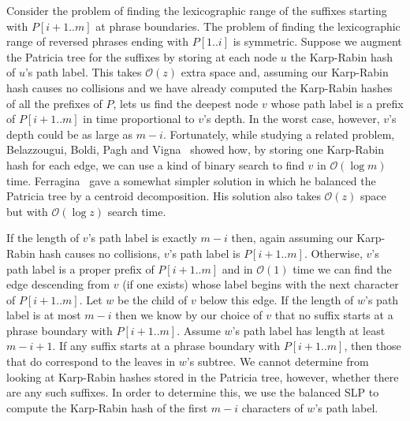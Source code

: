 \documentclass[review]{elsarticle}
\newcommand{\Oh}[1]
    {\ensuremath{\mathcal{O}\!\left( {#1} \right)}}
\begin{document}
Consider the problem of finding the lexicographic range of the suffixes starting with \(P [i + 1..m]\) at phrase boundaries.  The problem of finding the lexicographic range of reversed phrases ending with \(P [1..i]\) is symmetric. Suppose we augment the Patricia tree for the suffixes by storing at each node $u$ the Karp-Rabin hash of $u$'s path label.  This takes $\Oh{z}$ extra space and, assuming our Karp-Rabin hash causes no collisions and we have already computed the Karp-Rabin hashes of all the prefixes of $P$, lets us find the deepest node $v$ whose path label is a prefix of \(P [i + 1..m]\) in time proportional to $v$'s depth.  In the worst case, however, $v$'s depth could be as large as \(m - i\).  Fortunately, while studying a related problem, Belazzougui, Boldi, Pagh and Vigna~\cite{BBPV09,BBPV10} showed how, by storing one Karp-Rabin hash for each edge, we can use a kind of binary search to find $v$ in $\Oh{\log m}$ time.  Ferragina~\cite{Fer11} gave a somewhat simpler solution in which he balanced the Patricia tree by a centroid decomposition.  His solution also takes $\Oh{z}$ space but with $\Oh{\log z}$ search time.

If the length of $v$'s path label is exactly \(m - i\) then, again assuming our Karp-Rabin hash causes no collisions, $v$'s path label is \(P [i + 1..m]\).  Otherwise, $v$'s path label is a proper prefix of \(P [i + 1..m]\) and in $\Oh{1}$ time we can find the edge descending from $v$ (if one exists) whose label begins with the next character of \(P [i + 1..m]\).  Let $w$ be the child of $v$ below this edge.  If the length of $w$'s path label is at most \(m - i\) then we know by our choice of $v$ that no suffix starts at a phrase boundary with \(P [i + 1..m]\).  Assume $w$'s path label has length at least \(m - i + 1\).  If any suffix starts at a phrase boundary with \(P [i + 1..m]\), then those that do correspond to the leaves in $w$'s subtree.  We cannot determine from looking at Karp-Rabin hashes stored in the Patricia tree, however, whether there are any such suffixes.  In order to determine this, we use the balanced SLP to compute the Karp-Rabin hash of the first \(m - i\) characters of $w$'s path label.
\end{document}
